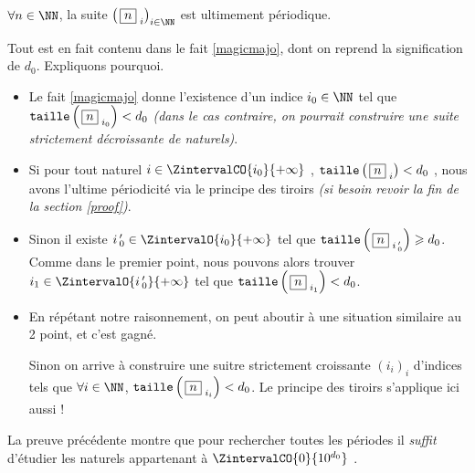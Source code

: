 \medskip

\begin{fact}\label{beautifulproof}
	$\forall n \in \NN$, la suite $\left( \, \sqseq{n}{i} \right)_{i \in \NN}$ est ultimement périodique.
\end{fact}

\begin{proof*}
	Tout est en fait contenu dans le fait \ref{magicmajo}, dont on reprend la signification de $d_0$. Expliquons pourquoi.
	\begin{itemize}[label = \textbullet]
		\item Le fait \ref{magicmajo} donne l'existence d'un indice $i_0 \in \NN$ tel que $\operatorname{\text{\normalfont\texttt{taille}}}\left( \, \fbox{$n$}_{\,\,i_0} \right) < d_0$ \emph{(dans le cas contraire, on pourrait construire une suite strictement décroissante de naturels)}.

		\item Si pour tout naturel $i \in \ZintervalCO{i_0}{+\infty}$ , $\operatorname{\text{\normalfont\texttt{taille}}}\left( \, \fbox{$n$}_{\,\,i} \right) < d_0$ , nous avons l'ultime périodicité via le principe des tiroirs \emph{(si besoin revoir la fin de la section \ref{proof})}.

		\item Sinon il existe $i\,^\prime_0 \in \ZintervalO{i_0}{+\infty}$ tel que $\operatorname{\text{\normalfont\texttt{taille}}}\left( \, \fbox{$n$}_{\,\,i\,^\prime_0} \right) \geqslant d_0$. Comme dans le premier point, nous pouvons alors trouver $i_1 \in \ZintervalO{i\,^\prime_0}{+\infty}$ tel que $\operatorname{\text{\normalfont\texttt{taille}}}\left( \, \fbox{$n$}_{\,\,i_1} \right) < d_0$.
		
		\item En répétant notre raisonnement,
		on peut aboutir à une situation similaire au 2\ieme{} point, et c'est gagné. 
		
		\noindent
		Sinon on arrive à construire une suitre strictement croissante $\left( i_i \right)_i$ d'indices tels que $\forall i \in \NN$, $\operatorname{\text{\normalfont\texttt{taille}}}\left( \, \fbox{$n$}_{\,\,i_i} \right) < d_0$. Le principe des tiroirs s'applique ici aussi !
	\end{itemize}
\end{proof*}



\medskip

\begin{remark}
	La preuve précédente montre que pour rechercher toutes les périodes il \emph{\og suffit \fg} d'étudier les naturels appartenant à $\ZintervalCO{0}{10^{d_0}}$ .
\end{remark}
